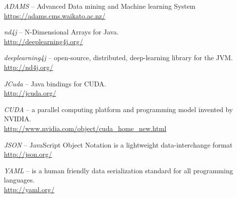 %

\begin{thebibliography}{999}

		\textit{ADAMS} -- Advanced Data mining and Machine learning System \\
		\url{https://adams.cms.waikato.ac.nz/}{}
		
		\textit{nd4j} -- N-Dimensional Arrays for Java. \\
		\url{http://deeplearning4j.org/}{}

		\textit{deeplearning4j} -- open-source, distributed,
		deep-learning library for the JVM. \\
		\url{http://nd4j.org/}{}

		\textit{JCuda} -- Java bindings for CUDA. \\
		\url{http://jcuda.org/}{}

		\textit{CUDA} -- a parallel computing platform and
		programming model invented by NVIDIA. \\
		\url{http://www.nvidia.com/object/cuda_home_new.html}{}

		\textit{JSON} -- JavaScript Object Notation is a lightweight data-interchange format \\
		\url{http://json.org/}{}

		\textit{YAML} -- is a human friendly data serialization
                standard for all programming languages. \\
		\url{http://yaml.org/}{}

\end{thebibliography}
